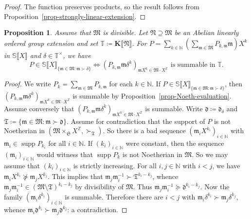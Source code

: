 \documentclass{article}
\newcommand{\assign}{\coloneqq}
\newcommand{\nsucccurlyeq}{\mathrel{\not\succcurlyeq}}
\newcommand{\suchthat}{:}
\newcommand{\tmop}[1]{\ensuremath{\operatorname{#1}}}
\newtheorem{proposition}[theorem]{Proposition}
\theoremstyle{remark}\newtheorem*{convention*}{Convention}
\begin{document}
\begin{proof}
  The function preserves products, so the result follows from
  Proposition~\ref{prop-strongly-linear-extension}.
\end{proof}

\begin{proposition}
  \label{prop-conv-duality}Assume that $\mathfrak{M}$ is divisible. Let
  $\mathfrak{N} \supseteq \mathfrak{M}$ be an Abelian linearly ordered group
  extension and set $\mathbb{T} \assign \mathbf{K} \llbracket \mathfrak{N}
  \rrbracket$. For $P = \sum_{k \in \mathbb{N}} \left(
  \sum_{\mathfrak{m} \in \mathfrak{M}} P_{k, \mathfrak{m}} \mathfrak{m}
  \right) X^k$ in $\mathbb{S} \llbracket X \rrbracket$ and $\delta \in
  \mathbb{T}^{\times}$, we have
  \[ P \in \mathbb{S} \llbracket X \rrbracket_{\{\mathfrak{m} \in \mathfrak{M}
     \suchthat \mathfrak{m} \succ \delta\}} \Longleftrightarrow (P_{k,
     \mathfrak{m}} \mathfrak{m} \delta^k)_{\mathfrak{m}X^k \in \mathfrak{M}
     \cdot X^{\mathbb{Z}}} \text{ is summable in $\mathbb{T}$.} \]
\end{proposition}

\begin{proof}
  We write $P_k = \sum_{\mathfrak{m} \in \mathfrak{M}} P_{k, \mathfrak{m}}$
  for each $k \in \mathbb{N}$. If $P \in \mathbb{S} \llbracket X
  \rrbracket_{\{\mathfrak{m} \in \mathfrak{M} \suchthat \mathfrak{m} \succ
  \delta\}}$, then $(P_{k, \mathfrak{m}} \mathfrak{m}
  \delta^k)_{\mathfrak{m}X^k \in \mathfrak{M} \cdot X^{\mathbb{Z}}}$ is
  summable by Proposition~\ref{prop-Noeth-evaluation}. Assume conversely that $(P_{k,
  \mathfrak{m}} \mathfrak{m} \delta^k)_{\mathfrak{m}X^k \in \mathfrak{M} \cdot
  X^{\mathbb{Z}}}$ is summable. Write $\mathfrak{d} \assign
  \mathfrak{d}_{\delta}$ and $\mathfrak{T} \assign \{\mathfrak{m} \in
  \mathfrak{M} \suchthat \mathfrak{m} \succ \mathfrak{d}\}$. Assume for
  contradiction that the support of $P$ is not Noetherian in $(\mathfrak{M}
  \times_{\mathfrak{S}} X^{\mathbb{Z}}, \succ_{\mathfrak{T}})$. So there is a
  bad sequence $(\mathfrak{m}_i X^{k_i})_{i \in \mathbb{N}}$ with
  $\mathfrak{m}_i \in \tmop{supp} P_{k_i}$ for all $i \in \mathbb{N}$. If
  $(k_i)_{i \in \mathbb{N}}$ were constant, then the sequence
  $(\mathfrak{m}_i)_{i \in \mathbb{N}}$ would witness that $\tmop{supp} P_k$
  is not Noetherian in $\mathfrak{M}$. So we may assume that $(k_i)_{i \in
  \mathbb{N}}$ is strictly increasing. For all $i, j \in \mathbb{N}$ with $i <
  j$, we have $\mathfrak{m}_i X^{k_i} \nsucccurlyeq \mathfrak{m}_j X^{k_j}$.
  This implies that $\mathfrak{m}_j \mathfrak{m}_i^{- 1} \succ
  \mathfrak{T}^{k_i - k_j}$, whence $\mathfrak{m}_j \mathfrak{m}_i^{- 1} \in
  (\mathfrak{M} \setminus \mathfrak{T})^{k_i - k_j}$ by divisibility of
  $\mathfrak{M}$. Thus $\mathfrak{m}_j \mathfrak{m}_i^{- 1} \succcurlyeq
  \mathfrak{d}^{k_i - k_j}$. Now the family $(\mathfrak{m}_i \delta^{k_i})_{i
  \in \mathbb{N}}$ is summable. Therefore there are $i < j$ with
  $\mathfrak{m}_i \delta^{k_i} \succ \mathfrak{m}_j \delta^{k_j}$, whence
  $\mathfrak{m}_i \mathfrak{d}^{k_i} \succ \mathfrak{m}_j \mathfrak{d}^{k_j}$:
  a contradiction. \end{proof}
\end{document}
